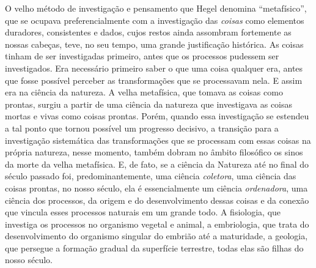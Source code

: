 O velho método de investigação e pensamento
que Hegel 
denomina ``metafísico'', que se ocupava preferencialmente com a
investigação das \emph{coisas }como elementos duradores, 
consistentes e dados, cujos restos ainda assombram
fortemente as nossas cabeças, teve, no seu tempo, uma grande
justificação histórica. As coisas tinham de ser investigadas primeiro,
antes que os processos pudessem ser investigados. Era necessário
primeiro saber o que uma coisa qualquer era, antes que fosse possível
perceber as transformações que se processavam nela. E assim era na
ciência da natureza. A velha metafísica, que tomava as coisas como
prontas, surgiu a partir de uma ciência da natureza que investigava as
coisas mortas e vivas como coisas prontas. Porém, quando essa
investigação se estendeu a tal ponto que tornou possível um progresso
decisivo, a transição para a investigação sistemática das transformações
que se processam com essas coisas na própria natureza, nesse momento,
também dobram no âmbito filosófico os sinos da morte da velha
metafísica. E, de fato, se a ciência da Natureza até no final do século
passado foi, predominantemente, uma ciência \emph{coletora}, uma ciência
das coisas prontas, no nosso século, ela é essencialmente um
ciência \emph{ordenadora}, uma ciência dos processos, da origem e do
desenvolvimento dessas coisas e da conexão que vincula esses processos
naturais em um grande todo. A fisiologia, que investiga os processos no
organismo vegetal e animal, a embriologia, que trata do desenvolvimento
do organismo singular do embrião até a maturidade, a geologia, que
persegue a formação gradual da superfície terrestre, todas elas são
filhas do nosso século.

